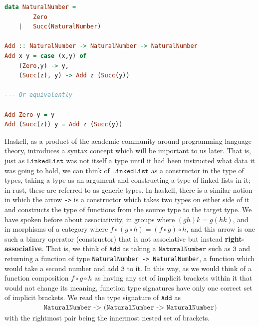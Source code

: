 \documentclass[11pt]{article}
\begin{document}
\begin{lstlisting}[language=Haskell]
data NaturalNumber =
		Zero
	|	Succ(NaturalNumber)
	
Add :: NaturalNumber -> NaturalNumber -> NaturalNumber
Add x y = case (x,y) of
	(Zero,y) -> y,
	(Succ(z), y) -> Add z (Succ(y))
	
--- Or equivalently

Add Zero y = y
Add (Succ(z)) y = Add z (Succ(y))
\end{lstlisting}

Haskell, as a product of the academic community around programming language theory, introduces a syntax concept which will be important to us later. That is, just as $\mathtt{LinkedList}$ was not itself a type until it had been instructed what data it was going to hold, we can think of $\mathtt{LinkedList}$ as a constructor in the type of types, taking a type as an argument and constructing a type of linked lists in it; in rust, these are referred to as generic types. In haskell, there is a similar notion in which the arrow \texttt{->} is a constructor which takes two types on either side of it and constructs the type of functions from the source type to the target type. We have spoken before about associativity, in groups where $(gh)k = g(hk)$, and in morphisms of a category where $f\circ (g \circ h) = (f \circ g) \circ h$, and this arrow is one such a binary operator (constructor) that is not associative but instead \textbf{right-associative}. That is, we think of $\mathtt{Add}$ as taking a $\mathtt{NaturalNumber}$ such as $\mathtt{3}$ and returning a function of type \texttt{NaturalNumber -> NaturalNumber}, a function which would take a second number and add $\mathtt{3}$ to it. In this way, as we would think of a function composition $f \circ g \circ h$ as having any set of implicit brackets within it that would not change its meaning, function type signatures have only one correct set of implicit brackets. We read the type signature of $\mathtt{Add}$ as \begin{gather*}
\texttt{NaturalNumber -> (NaturalNumber -> NaturalNumber)}
\end{gather*}
with the rightmost pair being the innermost nested set of brackets.
\end{document}
